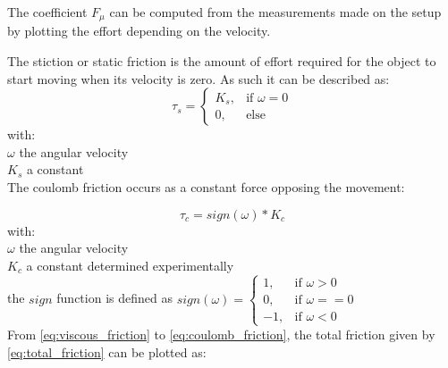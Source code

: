 The coefficient $F_\mu$ can be computed from the measurements made on the setup by plotting the effort depending on the velocity.

The stiction or static friction is the amount of effort required for the object to start moving when its velocity is zero. As such it can be described as:
\vspace{9pt}
\begin{equation} 
\tau_s =  \begin{cases} K_s, & \mbox{if } \omega = 0 \\ 0, & \mbox{else} \end{cases}
\label{eq:static_friction}
\end{equation}
with:\\
\hspace*{8mm}$\omega$ the angular velocity\\
\hspace*{8mm}$K_s$ a constant\\

The coulomb friction occurs as a constant force opposing the movement:

\begin{equation}
\tau_c = sign(\omega)*K_c
\label{eq:coulomb_friction}
\end{equation}
with:\\
\hspace*{8mm}$\omega$ the angular velocity\\
\hspace*{8mm}$K_c$ a constant determined experimentally\\
\hspace*{8mm}the $sign$ function is defined as $sign(\omega) = \begin{cases} 1, & \mbox{if } \omega > 0 \\ 0, & \mbox{if } \omega == 0 \\ -1, & \mbox{if } \omega < 0\end{cases}$\\

From \eqref{eq:viscous_friction} to \eqref{eq:coulomb_friction}, the total friction given by \eqref{eq:total_friction} can be plotted as:

